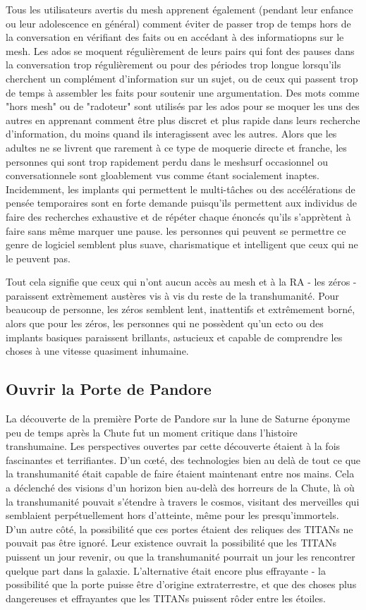 Tous les utilisateurs avertis du mesh apprenent également (pendant leur enfance ou leur adolescence en général) comment éviter de passer trop de temps hors de la conversation en vérifiant des faits ou en accédant à des informatiopns sur le mesh. Les ados se moquent régulièrement de leurs pairs qui font des pauses dans la conversation trop régulièrement ou pour des périodes trop longue lorsqu'ils cherchent un complément d'information sur un sujet, ou de ceux qui passent trop de temps à assembler les faits pour soutenir une argumentation. Des mots comme "hors mesh" ou de "radoteur" sont utilisés par les ados pour se moquer les uns des autres en apprenant comment être plus discret et plus rapide dans leurs recherche d'information, du moins quand ils interagissent avec les autres. Alors que les adultes ne se livrent que rarement à ce type de moquerie directe et franche, les personnes qui sont trop rapidement perdu dans le meshsurf occasionnel ou conversationnele sont gloablement vus comme étant socialement inaptes. Incidemment, les implants qui permettent le multi-tâches ou des accélérations de pensée temporaires sont en forte demande puisqu'ils permettent aux individus de faire des recherches exhaustive et de répéter chaque énoncés qu'ils s'apprètent à faire sans même marquer une pause. les personnes qui peuvent se permettre ce genre de logiciel semblent plus suave, charismatique et intelligent que ceux qui ne le peuvent pas. 

Tout cela signifie que ceux qui n'ont aucun accès au mesh et à la RA - les zéros - paraissent extrèmement austères vis à vis du reste de la transhumanité. Pour beaucoup de personne, les zéros semblent lent, inattentifs et extrêmement borné, alors que pour les zéros, les personnes qui ne possèdent qu'un ecto ou des implants basiques paraissent brillants, astucieux et capable de comprendre les choses à une vitesse quasiment inhumaine. 

\subsection{Ouvrir la Porte de Pandore} \label{sec:open-pand-gate} 

La découverte de la première Porte de Pandore sur la lune de Saturne éponyme peu de temps après la Chute fut un moment critique dans l'histoire transhumaine. Les perspectives ouvertes par cette découverte étaient à la fois fascinantes et terrifiantes. D'un cœté, des technologies bien au delà de tout ce que la transhumanité était capable de faire étaient maintenant entre nos mains. Cela a déclenché des visions d'un horizon bien au-delà des horreurs de la Chute, là où la transhumanité pouvait s'étendre à travers le cosmos, visitant des merveilles qui semblaient perpétuellement hors d'atteinte, même  pour les presqu'immortels. D'un autre côté, la possibilité que ces portes étaient des reliques des TITANs ne pouvait pas être ignoré. Leur existence ouvrait la possibilité que les TITANs puissent un jour revenir, ou que la transhumanité pourrait un jour les rencontrer quelque part dans la galaxie. L'alternative était encore plus effrayante - la possibilité que la porte puisse être d'origine extraterrestre, et que des choses plus dangereuses et effrayantes que les TITANs puissent rôder entre les étoiles. 

